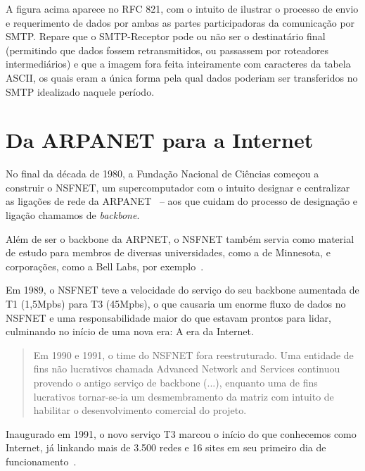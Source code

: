 \documentclass[conference]{IEEEtran}
\begin{document}
	A figura acima aparece no RFC 821, com o intuito de ilustrar o processo de envio e requerimento de dados por ambas as partes participadoras da comunicação por SMTP. Repare que o SMTP-Receptor pode ou não ser o destinatário final (permitindo que dados fossem retransmitidos, ou passassem por roteadores intermediários) e que a imagem fora feita inteiramente com caracteres da tabela ASCII, os quais eram a única forma pela qual dados poderiam ser transferidos no SMTP idealizado naquele período.~\cite{rfc821}


	
\section{Da ARPANET para a Internet}

  No final da década de 1980, a Fundação Nacional de Ciências começou a
  construir o NSFNET, um supercomputador com o intuito designar e centralizar as
  ligações de rede da ARPANET~\cite{nsfnet} -- aos que cuidam do processo de designação e
  ligação chamamos de \emph{backbone}.

  Além de ser o backbone da ARPNET, o NSFNET também servia como material de
  estudo para membros de diversas universidades, como a de Minnesota, e
  corporações, como a Bell Labs, por exemplo~\cite{nsfnet}.

  Em 1989, o NSFNET teve a velocidade do serviço do seu backbone aumentada de T1
  (1,5Mpbs) para T3 (45Mpbs), o que causaria um enorme fluxo de dados no NSFNET
  e uma responsabilidade maior do que estavam prontos para lidar, culminando no
  início de uma nova era: A era da Internet.

  \begin{quote}

    Em 1990 e 1991, o time do NSFNET fora reestruturado. Uma entidade de
    fins não lucrativos chamada Advanced Network and Services continuou provendo
    o antigo serviço de backbone (...), enquanto uma de fins lucrativos
    tornar-se-ia um desmembramento da matriz com intuito de habilitar o
    desenvolvimento comercial do projeto.~\cite{nsfnet}

  \end{quote}

  Inaugurado em 1991, o novo serviço T3 marcou o início do que conhecemos como
  Internet, já linkando mais de 3.500 redes e 16 sites em seu primeiro dia de
  funcionamento~\cite{nsfnet}.
\end{document}
